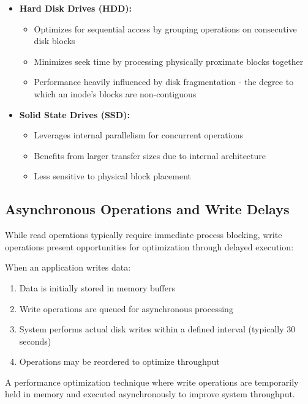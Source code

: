 \documentclass[../../compsys.tex]{subfiles}
\begin{document}
\begin{itemize}
    \item \textbf{Hard Disk Drives (HDD):}
    \begin{itemize}
        \item Optimizes for sequential access by grouping operations on consecutive disk blocks
        \item Minimizes seek time by processing physically proximate blocks together
        \item Performance heavily influenced by disk fragmentation - the degree to which an inode's blocks are non-contiguous
    \end{itemize}
    
    \item \textbf{Solid State Drives (SSD):}
    \begin{itemize}
        \item Leverages internal parallelism for concurrent operations
        \item Benefits from larger transfer sizes due to internal architecture
        \item Less sensitive to physical block placement
    \end{itemize}
\end{itemize}

\subsection{Asynchronous Operations and Write Delays}

While read operations typically require immediate process blocking, write operations present opportunities for optimization through delayed execution:

\begin{example}
When an application writes data:
\begin{enumerate}
    \item Data is initially stored in memory buffers
    \item Write operations are queued for asynchronous processing
    \item System performs actual disk writes within a defined interval (typically 30 seconds)
    \item Operations may be reordered to optimize throughput
\end{enumerate}
\end{example}
\vspace{10px}
\begin{definition}
A performance optimization technique where write operations are temporarily held in memory and executed asynchronously to improve system throughput.
\end{definition}
\vspace{5px}
\end{document}
